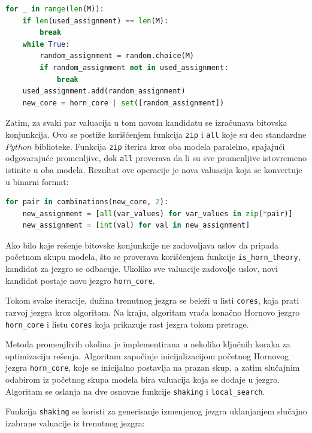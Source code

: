 \documentclass[12pt,oneside]{memoir}
\begin{document}
\begin{lstlisting}[language=Python]
for _ in range(len(M)):
    if len(used_assignment) == len(M):
        break
    while True:
        random_assignment = random.choice(M)
        if random_assignment not in used_assignment:
            break
    used_assignment.add(random_assignment)
    new_core = horn_core | set([random_assignment])
\end{lstlisting}
\vspace{0.5cm}

Zatim, za svaki par valuacija u tom novom kandidatu se izračunava bitovska konjunkcija. Ovo se postiže korišćenjem funkcija \texttt{zip} i \texttt{all} koje su deo standardne $Python$ biblioteke. Funkcija \texttt{zip} iterira kroz oba modela paralelno, spajajući odgovarajuće promenljive, dok \texttt{all} proverava da li su sve promenljive istovremeno istinite u oba modela. Rezultat ove operacije je nova valuacija koja se konvertuje u binarni format:

\begin{lstlisting}[language=Python]
for pair in combinations(new_core, 2):
    new_assignment = [all(var_values) for var_values in zip(*pair)]
    new_assignment = [int(val) for val in new_assignment]
\end{lstlisting}
\vspace{0.5cm}

Ako bilo koje rešenje bitovske konjunkcije ne zadovoljava uslov da pripada početnom skupu modela, što se proverava korišćenjem funkcije \texttt{is\_horn\_theory}, kandidat za jezgro se odbacuje. Ukoliko sve valuacije zadovolje uslov, novi kandidat postaje novo jezgro \texttt{horn\_core}.

Tokom svake iteracije, dužina trenutnog jezgra se beleži u listi \texttt{cores}, koja prati razvoj jezgra kroz algoritam. Na kraju, algoritam vraća konačno Hornovo jezgro \texttt{horn\_core} i listu \texttt{cores} koja prikazuje rast jezgra tokom pretrage.

Metoda promenjlivih okolina je implementirana u nekoliko ključnih koraka za optimizaciju rešenja. Algoritam započinje inicijalizacijom početnog Hornovog jezgra \texttt{horn\_core}, koje se inicijalno postavlja na prazan skup, a zatim slučajnim odabirom iz početnog skupa modela bira valuacija koja se dodaje u jezgro. Algoritam se oslanja na dve osnovne funkcije \texttt{shaking} i \texttt{local\_search}.

Funkcija \texttt{shaking} se koristi za generisanje izmenjenog jezgra uklanjanjem slučajno izabrane valuacije iz trenutnog jezgra:
\end{document}

